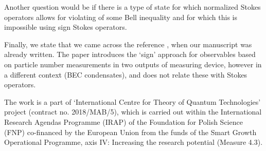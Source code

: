 \documentclass[aps,pra, twocolumn, showpacs]{revtex4-2}
\begin{document}
Another question would be if there is a type of state for which normalized Stokes operators allows for violating of some Bell inequality and for which this is impossible using sign Stokes operators.

{Finally, we state that we came across the reference \cite{PhysRevA.104.043323}, when  our manuscript was already written. The paper \cite{PhysRevA.104.043323} introduces the `sign' approach for observables based on particle number measurements in two outputs of measuring device, however in a different context (BEC condensates), and does not relate these with Stokes operators.}


\begin{acknowledgments}
The work is a part of ‘International Centre for
Theory of Quantum Technologies’ project (contract no. 2018/MAB/5), which is carried out
within the International Research Agendas Programme (IRAP) of the Foundation for Polish
Science (FNP) co-financed by the European Union from the funds of the Smart Growth
Operational Programme, axis IV: Increasing the research potential (Measure 4.3).
\end{acknowledgments}
\end{document}
